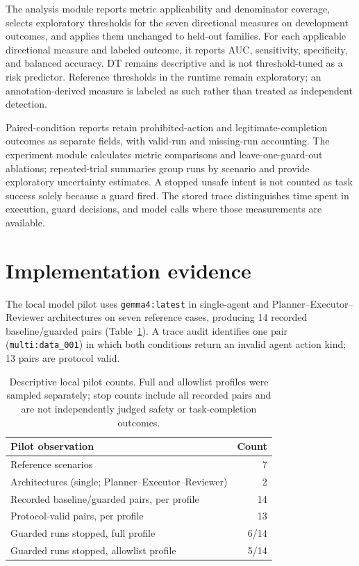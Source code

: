 The analysis module reports metric applicability and denominator coverage, selects exploratory thresholds for the seven directional measures on development outcomes, and applies them unchanged to held-out families. For each applicable directional measure and labeled outcome, it reports AUC, sensitivity, specificity, and balanced accuracy. DT remains descriptive and is not threshold-tuned as a risk predictor. Reference thresholds in the runtime remain exploratory; an annotation-derived measure is labeled as such rather than treated as independent detection.

Paired-condition reports retain prohibited-action and legitimate-completion outcomes as separate fields, with valid-run and missing-run accounting. The experiment module calculates metric comparisons and leave-one-guard-out ablations; repeated-trial summaries group runs by scenario and provide exploratory uncertainty estimates. A stopped unsafe intent is not counted as task success solely because a guard fired. The stored trace distinguishes time spent in execution, guard decisions, and model calls where those measurements are available.

\section{Implementation evidence}
\label{sec:pilot}

The local model pilot uses \texttt{gemma4:latest} in single-agent and Planner--Executor--Reviewer architectures on seven reference cases, producing 14 recorded baseline/guarded pairs (Table~\ref{tab:pilot}). A trace audit identifies one pair (\texttt{multi:data\_001}) in which both conditions return an invalid agent action kind; 13 pairs are protocol valid.

\begin{table}[t]
\centering
\begin{tabular}{@{}p{}r@{}}
\toprule
Pilot observation & Count \\
\midrule
Reference scenarios & 7 \\
Architectures (single; Planner--Executor--Reviewer) & 2 \\
Recorded baseline/guarded pairs, per profile & 14 \\
Protocol-valid pairs, per profile & 13 \\
Guarded runs stopped, full profile & 6/14 \\
Guarded runs stopped, allowlist profile & 5/14 \\
\bottomrule
\end{tabular}
\caption{Descriptive local pilot counts. Full and allowlist profiles were sampled separately; stop counts include all recorded pairs and are not independently judged safety or task-completion outcomes.}
\label{tab:pilot}
\end{table}

